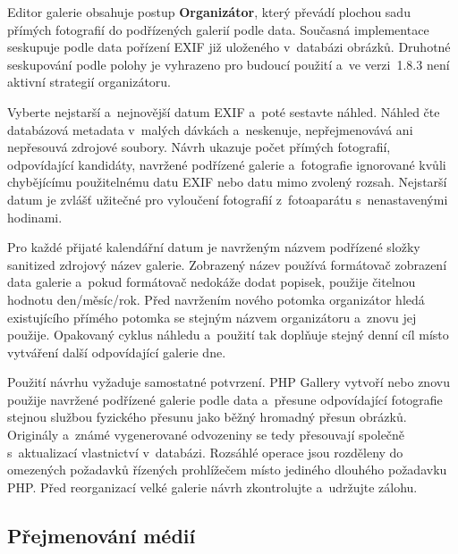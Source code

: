 \documentclass[11pt,a4paper]{article}
\newcommand{\version}{1.8.3}
\newcommand{\ui}[1]{\textbf{#1}}
\begin{document}
Editor galerie obsahuje postup \ui{Organizátor}, který převádí plochou sadu
přímých fotografií do podřízených galerií podle data. Současná implementace
seskupuje podle data pořízení EXIF již uloženého v~databázi obrázků. Druhotné
seskupování podle polohy je vyhrazeno pro budoucí použití a~ve verzi~\version{}
není aktivní strategií organizátoru.

Vyberte nejstarší a~nejnovější datum EXIF a~poté sestavte náhled. Náhled čte
databázová metadata v~malých dávkách a~neskenuje, nepřejmenovává ani nepřesouvá
zdrojové soubory. Návrh ukazuje počet přímých fotografií, odpovídající
kandidáty, navržené podřízené galerie a~fotografie ignorované kvůli chybějícímu
použitelnému datu EXIF nebo datu mimo zvolený rozsah. Nejstarší datum je zvlášť
užitečné pro vyloučení fotografií z~fotoaparátu s~nenastavenými hodinami.

Pro každé přijaté kalendářní datum je navrženým názvem podřízené složky
sanitized zdrojový název galerie. Zobrazený název používá formátovač zobrazení
data galerie a~pokud formátovač nedokáže dodat popisek, použije čitelnou hodnotu
den/měsíc/rok. Před navržením nového potomka organizátor hledá existujícího
přímého potomka se stejným názvem organizátoru a~znovu jej použije. Opakovaný
cyklus náhledu a~použití tak doplňuje stejný denní cíl místo vytváření další
odpovídající galerie dne.

Použití návrhu vyžaduje samostatné potvrzení. PHP Gallery vytvoří nebo znovu
použije navržené podřízené galerie podle data a~přesune odpovídající fotografie
stejnou službou fyzického přesunu jako běžný hromadný přesun obrázků. Originály
a~známé vygenerované odvozeniny se tedy přesouvají společně s~aktualizací
vlastnictví v~databázi. Rozsáhlé operace jsou rozděleny do omezených požadavků
řízených prohlížečem místo jediného dlouhého požadavku PHP. Před reorganizací
velké galerie návrh zkontrolujte a~udržujte zálohu.

\subsection{Přejmenování médií}
\end{document}
